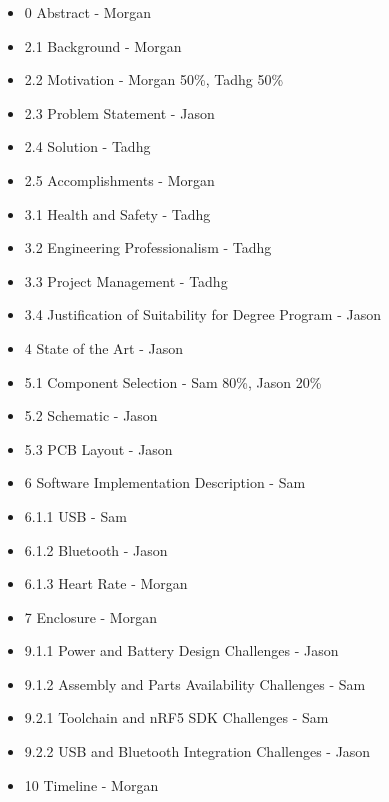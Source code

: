 \begin{itemize}
    \item 0 Abstract - Morgan
    \item 2.1 Background - Morgan
    \item 2.2 Motivation - Morgan 50\%, Tadhg 50\%
    \item 2.3 Problem Statement - Jason
    \item 2.4 Solution - Tadhg
    \item 2.5 Accomplishments - Morgan
    \item 3.1 Health and Safety - Tadhg
    \item 3.2 Engineering Professionalism - Tadhg
    \item 3.3 Project Management - Tadhg
    \item 3.4 Justification of Suitability for Degree Program - Jason
    \item 4 State of the Art - Jason
    \item 5.1 Component Selection - Sam 80\%, Jason 20\%
    \item 5.2 Schematic - Jason
    \item 5.3 PCB Layout - Jason
    \item 6 Software Implementation Description - Sam
    \item 6.1.1 USB - Sam
    \item 6.1.2 Bluetooth - Jason
    \item 6.1.3 Heart Rate - Morgan
    \item 7 Enclosure - Morgan
    \item 9.1.1 Power and Battery Design Challenges - Jason
    \item 9.1.2 Assembly and Parts Availability Challenges - Sam
    \item 9.2.1 Toolchain and nRF5 SDK Challenges - Sam
    \item 9.2.2 USB and Bluetooth Integration Challenges - Jason
    \item 10 Timeline - Morgan
\end{itemize}
